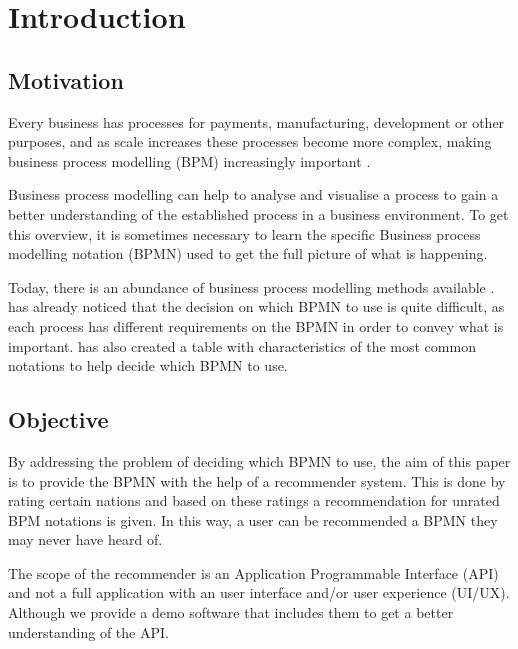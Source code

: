\chapter{Introduction}

\section{Motivation}

Every business has processes for payments, manufacturing, development or other purposes, and as scale increases these processes become more complex, making business process modelling (BPM) increasingly important \cite{bpmComparison}.


Business process modelling can help to analyse and visualise a process to gain a better understanding of the established process in a business environment. To get this overview, it is sometimes necessary to learn the specific Business process modelling notation (BPMN) used to get the full picture of what is happening.

Today, there is an abundance of business process modelling methods available \cite{bpm_survey}. \cite{bpm_review_framework} has already noticed that the decision on which BPMN to use is quite difficult, as each process has different requirements on the BPMN in order to convey what is important. \cite{bpm_review_framework} has also created a table with characteristics of the most common notations to help decide which BPMN to use.

\section{Objective}

By addressing the problem of deciding which BPMN to use, the aim of this paper is to provide the BPMN with the help of a recommender system. This is done by rating certain nations and based on these ratings a recommendation for unrated BPM notations is given. In this way, a user can be recommended a BPMN they may never have heard of.

The scope of the recommender is an Application Programmable Interface (API) and not a full application with an user interface and/or user experience (UI/UX). Although we provide a demo software that includes them to get a better understanding of the API.

